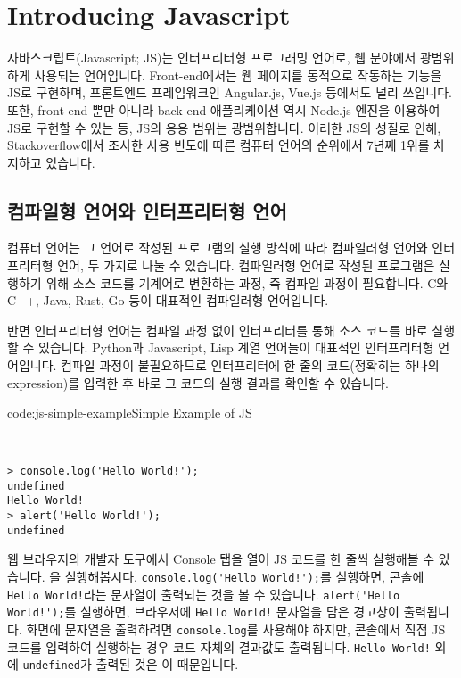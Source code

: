 \section{Introducing Javascript} \label{sect:introducing-javascript}

자바스크립트(Javascript; JS)는 인터프리터형 프로그래밍 언어로, 웹 분야에서 광범위하게 사용되는 언어입니다. Front-end에서는 웹 페이지를 동적으로 작동하는 기능을 JS로 구현하며, 프론트엔드 프레임워크인 Angular.js, Vue.js 등에서도 널리 쓰입니다. 또한, front-end 뿐만 아니라 back-end 애플리케이션 역시 Node.js 엔진을 이용하여 JS로 구현할 수 있는 등, JS의 응용 범위는 광범위합니다. 이러한 JS의 성질로 인해, Stackoverflow에서 조사한 사용 빈도에 따른 컴퓨터 언어의 순위에서 7년째 1위를 차지하고 있습니다. 

\subsection*{컴파일형 언어와 인터프리터형 언어}

컴퓨터 언어는 그 언어로 작성된 프로그램의 실행 방식에 따라 컴파일러형 언어와 인터프리터형 언어, 두 가지로 나눌 수 있습니다. 컴파일러형 언어로 작성된 프로그램은 실행하기 위해 소스 코드를 기계어로 변환하는 과정, 즉 컴파일 과정이 필요합니다. C와 C++, Java, Rust, Go 등이 대표적인 컴파일러형 언어입니다. 

반면 인터프리터형 언어는 컴파일 과정 없이 인터프리터를 통해 소스 코드를 바로 실행할 수 있습니다. Python과 Javascript, Lisp 계열 언어들이 대표적인 인터프리터형 언어입니다. 컴파일 과정이 불필요하므로 인터프리터에 한 줄의 코드(정확히는 하나의 expression)를 입력한 후 바로 그 코드의 실행 결과를 확인할 수 있습니다. 

\begin{codeenv}{code:js-simple-example}{Simple Example of JS}\begin{verbatim}


> console.log('Hello World!');
undefined
Hello World!
> alert('Hello World!');
undefined
\end{verbatim}
\end{codeenv}

웹 브라우저의 개발자 도구에서 Console 탭을 열어 JS 코드를 한 줄씩 실행해볼 수 있습니다. 을 실행해봅시다. \verb|console.log('Hello World!');|를 실행하면, 콘솔에 \verb|Hello World!|라는 문자열이 출력되는 것을 볼 수 있습니다. \verb|alert('Hello World!');|를 실행하면, 브라우저에 \verb|Hello World!| 문자열을 담은 경고창이 출력됩니다. 화면에 문자열을 출력하려면 \verb|console.log|를 사용해야 하지만, 콘솔에서 직접 JS 코드를 입력하여 실행하는 경우 코드 자체의 결과값도 출력됩니다. \verb|Hello World!| 외에 \verb|undefined|가 출력된 것은 이 때문입니다.
